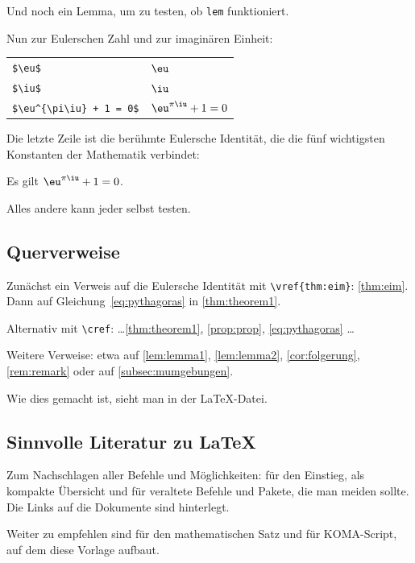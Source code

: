 \begin{lem}\label{lem:lemma2}
Und noch ein Lemma, um zu testen, ob \texttt{lem} funktioniert.
\end{lem}
Nun zur Eulerschen Zahl und zur imaginären Einheit:
\begin{center}
\begin{tabular}{ll}
	\verb|$\eu$| 					& $ \eu $ \\
	\verb|$\iu$| 					& $ \iu $ \\
	\verb|$\eu^{\pi\iu} + 1 = 0$| 	& $ \eu^{ \pi \iu } + 1 = 0 $
\end{tabular}
\end{center}
Die letzte Zeile ist die berühmte Eulersche Identität, die die fünf wichtigsten Konstanten der Mathematik verbindet:
\begin{theorem}[Euler]\label{thm:eim}
Es gilt $ \eu^{ \pi \iu } + 1 = 0 $.
\end{theorem}
Alles andere kann jeder selbst testen.
%
\subsection{Querverweise}\label{subsec:referenzen}
%
Zunächst ein Verweis auf die Eulersche Identität mit \verb|\vref{thm:eim}|: \vref{thm:eim}.
Dann auf Gleichung~\eqref{eq:pythagoras} in \vref{thm:theorem1}.

Alternativ mit \verb|\cref|: \ldots \cref{thm:theorem1}, \cref{prop:prop}, \vref{eq:pythagoras} \ldots

Weitere Verweise: etwa auf \vref{lem:lemma1}, \vref{lem:lemma2}, \vref{cor:folgerung}, \vref{rem:remark} oder auf \vref{subsec:mumgebungen}.

Wie dies gemacht ist, sieht man in der \LaTeX-Datei.
%
\subsection{Sinnvolle Literatur zu \LaTeX}
%
Zum Nachschlagen aller Befehle und Möglichkeiten: \textcite{lshort-german} für den Einstieg, \textcite{latex-refsheet} als kompakte Übersicht und \textcite{l2tabu} für veraltete Befehle und Pakete, die man meiden sollte.
Die Links auf die Dokumente sind hinterlegt.

Weiter zu empfehlen sind \textcite{graetzer:2007} für den mathematischen Satz und \textcite{kohm:2014} für KOMA-Script, auf dem diese Vorlage aufbaut.
